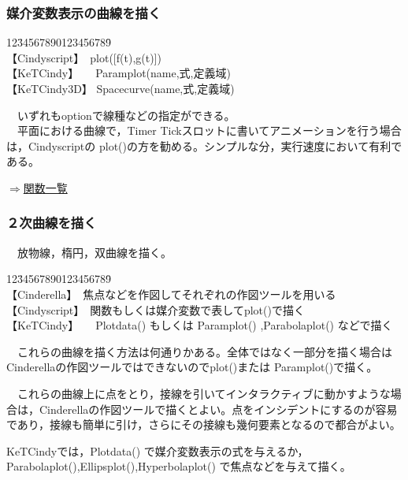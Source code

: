 \documentclass[papersize,a4paper,12pt,uplatex]{jsarticle}
\begin{document}
\subsubsection{媒介変数表示の曲線を描く}

\begin{tabbing}
12\=34567890123456789\=\kill\\

\>【Cindyscript】　\>plot([f(t),g(t)])\\
 \>【KeTCindy】　　\>Paramplot(name,式,定義域)　\\
 \>【KeTCindy3D】  \>Spacecurve(name,式,定義域)　\\
\end{tabbing}
　いずれもoptionで線種などの指定ができる。\\
　平面における曲線で，Timer Tickスロットに書いてアニメーションを行う場合は，Cindyscriptの plot()の方を勧める。シンプルな分，実行速度において有利である。\\
\begin{flushright} \hyperlink{functionlist3d}{$\Rightarrow$関数一覧}\end{flushright}


\subsubsection{２次曲線を描く}
　放物線，楕円，双曲線を描く。
\begin{tabbing}
12\=34567890123456789\=\kill\\

\>【Cinderella】　\>焦点などを作図してそれぞれの作図ツールを用いる\\ 
\>【Cindyscript】　\>関数もしくは媒介変数で表してplot()で描く\\
 \>【KeTCindy】　　\>Plotdata() もしくは Paramplot() ,Parabolaplot() などで描く\\
\end{tabbing}
　これらの曲線を描く方法は何通りかある。全体ではなく一部分を描く場合はCinderellaの作図ツールではできないのでplot()または Paramplot()で描く。

　これらの曲線上に点をとり，接線を引いてインタラクティブに動かすような場合は，Cinderellaの作図ツールで描くとよい。点をインシデントにするのが容易であり，接線も簡単に引け，さらにその接線も幾何要素となるので都合がよい。

KeTCindyでは，Plotdata() で媒介変数表示の式を与えるか，Parabolaplot(),Ellipsplot(),Hyperbolaplot() で焦点などを与えて描く。
\end{document}
